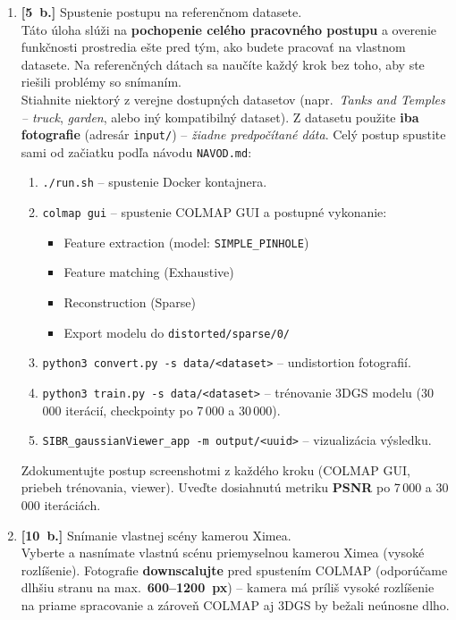 \documentclass{article}
\begin{document}
\begin{enumerate}

\item \textbf{[5~b.]} Spustenie postupu na referenčnom datasete.\\
Táto úloha slúži na \textbf{pochopenie celého pracovného postupu} a overenie funkčnosti
prostredia ešte pred tým, ako budete pracovať na vlastnom datasete.
Na referenčných dátach sa naučíte každý krok bez toho, aby ste riešili
problémy so snímaním.\\[4pt]
Stiahnite niektorý z verejne dostupných datasetov (napr.\ \textit{Tanks and
Temples – truck}, \textit{garden}, alebo iný kompatibilný dataset).
Z datasetu použite \textbf{iba fotografie} (adresár \texttt{input/}) –
\emph{žiadne predpočítané dáta}.
Celý postup spustite sami od začiatku podľa návodu \texttt{NAVOD.md}:

\begin{enumerate}
    \item \texttt{./run.sh} – spustenie Docker kontajnera.
    \item \texttt{colmap gui} – spustenie COLMAP GUI a postupné vykonanie:
        \begin{itemize}
            \item Feature extraction (model: \texttt{SIMPLE\_PINHOLE})
            \item Feature matching (Exhaustive)
            \item Reconstruction (Sparse)
            \item Export modelu do \texttt{distorted/sparse/0/}
        \end{itemize}
    \item \texttt{python3 convert.py -s data/<dataset>} – undistortion fotografií.
    \item \texttt{python3 train.py -s data/<dataset>} – trénovanie 3DGS modelu
          (30\,000 iterácií, checkpointy po 7\,000 a 30\,000).
    \item \texttt{SIBR\_gaussianViewer\_app -m output/<uuid>} – vizualizácia výsledku.
\end{enumerate}

Zdokumentujte postup screenshotmi z každého kroku (COLMAP GUI, priebeh trénovania,
viewer). Uveďte dosiahnutú metriku \textbf{PSNR} po 7\,000 a 30\,000 iteráciách.

\item \textbf{[10~b.]} Snímanie vlastnej scény kamerou Ximea.\\
Vyberte a nasnímate vlastnú scénu priemyselnou kamerou Ximea (vysoké rozlíšenie).
Fotografie \textbf{downscalujte} pred spustením COLMAP
(odporúčame dlhšiu stranu na max.\ \textbf{600–1200~px}) – kamera má príliš
vysoké rozlíšenie na priame spracovanie a zároveň COLMAP aj 3DGS by bežali
neúnosne dlho.


\end{enumerate}
\end{document}
